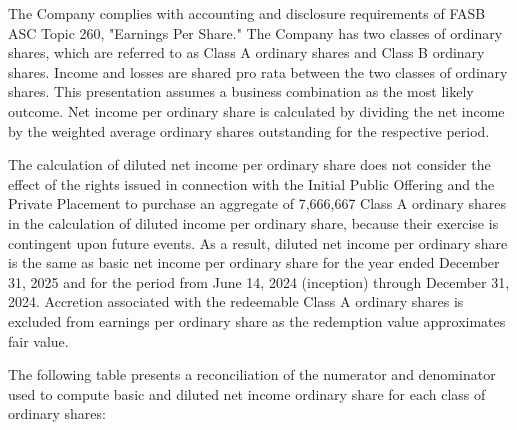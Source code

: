 \documentclass[11pt,a4paper]{article}
\begin{document}
The Company complies with accounting and disclosure requirements of FASB ASC Topic 260, "Earnings Per Share." The Company has two classes of ordinary shares, which are referred to as Class A ordinary shares and Class B ordinary shares. Income and losses are shared pro rata between the two classes of ordinary shares. This presentation assumes a business combination as the most likely outcome. Net income per ordinary share is calculated by dividing the net income by the weighted average ordinary shares outstanding for the respective period.

The calculation of diluted net income per ordinary share does not consider the effect of the rights issued in connection with the Initial Public Offering and the Private Placement to purchase an aggregate of 7,666,667 Class A ordinary shares in the calculation of diluted income per ordinary share, because their exercise is contingent upon future events. As a result, diluted net income per ordinary share is the same as basic net income per ordinary share for the year ended December 31, 2025 and for the period from June 14, 2024 (inception) through December 31, 2024. Accretion associated with the redeemable Class A ordinary shares is excluded from earnings per ordinary share as the redemption value approximates fair value.

The following table presents a reconciliation of the numerator and denominator used to compute basic and diluted net income ordinary share for each class of ordinary shares:
\end{document}
